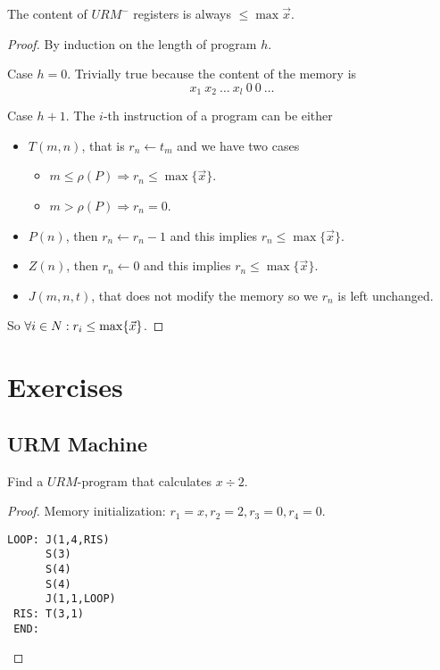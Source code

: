 \documentclass[12pt,a4paper,oneside]{book}
\begin{document}
\begin{lemma}
    \label{comp_ex_1_1_lemma}
    The content of $URM^-$ registers is always $\leq \max \vec{x}$.
    
    \begin{proof}
        By induction on the length of program $h$.
        
        \noindent Case $h = 0$. Trivially true because the content of
        the memory is \[ x_1\ x_2\ \ldots\ x_l\ 0\ 0\ \ldots \]
        
        \noindent Case $h + 1$. The $i$-th instruction of a program
        can be either
        \begin{itemize}
            \item $T(m,n)$, that is $r_n \leftarrow t_m$ and we have
              two cases
            \begin{itemize}
                \item $m \leq \rho(P) \Rightarrow r_n \leq \max
                  \{\vec{x}\}$.
                \item $m > \rho(P) \Rightarrow r_n = 0$.
            \end{itemize}
            \item $P(n)$, then $r_n \leftarrow r_n - 1$ and this
              implies $r_n \leq \max \{\vec{x}\}$.
            \item $Z(n)$, then $r_n \leftarrow 0$ and this implies
              $r_n \leq \max \{\vec{x}\}$.
            \item $J(m,n,t)$, that does not modify the memory so we
              $r_n$ is left unchanged.
        \end{itemize}
        So $\forall i \in N \mathrel{:} r_i \leq \max \{ \vec{x} \}$.
    \end{proof}
\end{lemma}



\section{Exercises}

\subsection{URM Machine}

\begin{exercise}
    Find a $URM$-program that calculates $x \div 2$.

    \begin{proof}
        Memory initialization: $r_1 = x, r_2 = 2, r_3 = 0, r_4 = 0$.

\begin{verbatim}
LOOP: J(1,4,RIS)
      S(3)
      S(4)
      S(4)
      J(1,1,LOOP)
 RIS: T(3,1)
 END:
\end{verbatim}
    \end{proof}
\end{exercise}
\end{document}
